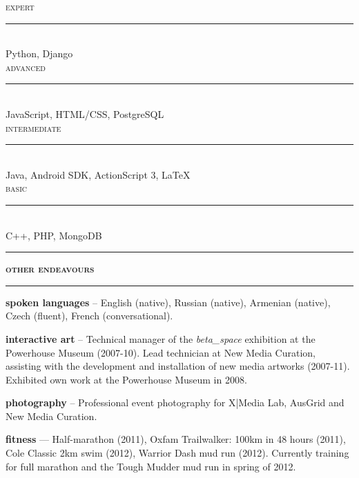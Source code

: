 \documentclass[a4paper,12pt]{article}
\begin{document}
\begin{spacing}{0.95}
\begin{minipage}[t]{95.5mm}
	{\large\textsc{expert}}\\
	\vspace{-2mm}%
	\rule[3mm]{\linewidth}{0.25mm}\\
	{\LARGE Python, Django}
	\\
	
	{\large\textsc{advanced}}\\
	\vspace{-2.1mm}%
	\rule[3mm]{\linewidth}{0.25mm}\\
	{\Large JavaScript, HTML/CSS, PostgreSQL}
	\\
	
	{\large\textsc{intermediate}}\\
	\vspace{-2.7mm}%
	\rule[3mm]{\linewidth}{0.25mm}\\	
	{\large Java, Android SDK, ActionScript 3, \LaTeX{}}
	\\
	
	{\large\textsc{basic}}\\
	\vspace{-3.2mm}%
	\rule[3mm]{\linewidth}{0.25mm}\\
	{\normalsize C++, PHP, MongoDB}
	
	\vspace{2.5mm}
	\rule[1mm]{\linewidth}{1mm}
	{\Large\textsc{\textbf{other endeavours}}}\\
	\vspace{2.5mm}%
	\rule[1mm]{\linewidth}{1mm}
	
	{\small
	\textbf{\textsf{\color{grey}spoken languages}} -- English (native), Russian (native), Armenian (native), Czech (fluent), French (conversational).
	
	\vspace{3mm}
	\textbf{\textsf{\color{grey}interactive art}} -- Technical manager of the \emph{beta\_space} exhibition at the Powerhouse Museum (2007-10). Lead technician at New Media Curation, assisting with the development and installation of  new media artworks (2007-11). Exhibited own work at the Powerhouse Museum in 2008.
	
	\vspace{3mm}
	\textbf{\textsf{\color{grey}photography}} -- Professional event photography for X|Media Lab, AusGrid and New Media Curation.
	
	\vspace{3mm}
	\textbf{\textsf{\color{grey}fitness}} --- Half-marathon (2011), Oxfam Trailwalker: 100km in 48 hours (2011), Cole Classic 2km swim (2012), Warrior Dash mud run (2012). Currently training for full marathon and the Tough Mudder mud run in spring of 2012.%
	}%
	

\end{minipage}
\end{spacing}
\end{document}
